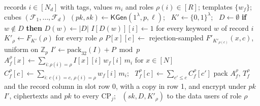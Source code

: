 \begin{algorithmic}[1]
\Require records $i\in[N_d]$ with tags, values $m_i$ and roles $\rho(i)\in[R]$;
  templates $\{w_f\}$; cubes $(\mathcal{F}_1,\dots,\mathcal{F}_d)$
\State $(pk,sk)\gets\mathsf{KGen}(1^\lambda,p,\ell)$; \ $K'\gets\{0,1\}^\lambda$; \ $D\gets\emptyset$
  \State \textbf{if} $w\notin D$ \textbf{then} $D(w)\gets|D|$ 
\EndFor
\State $I[D(w)][i]\gets1$ for every keyword $w$ of record $i$
\State $K'_\rho\gets F_{K'}(\rho)$ for every role $\rho$
\State $P[x][c]\gets$ rejection-sampled $F'_{K'_{\rho(c)}}(x,c)$, uniform on $\mathbb{Z}_p$
\State $I'\gets\mathrm{pack}_{32}(I)+P \bmod p$ 
  \State $A^{\rho}_f[x]\gets\sum_{i:\rho(i)=\rho} I[x][i]\,w_f[i]\,m_i$ for $x\in[N]$
  \State $C^{\rho}_f[c]\gets\sum_{i:\,c(i)=c,\,\rho(i)=\rho} w_f[i]\,m_i$; \ $T^{\rho}_f[c]\gets\sum_{c'\le c}C^{\rho}_f[c']$
  \State pack $A^{\rho}_f$, $T^{\rho}_f$ and the record column in slot row 0,
  \Statex \hspace{\algorithmicindent} with a copy in row 1, and encrypt under $pk$
\EndFor
\State \Return $I'$, ciphertexts and $pk$ to every $\text{CP}_j$;
  \ $(sk, D, K'_\rho)$ to the data users of role $\rho$
\end{algorithmic}
